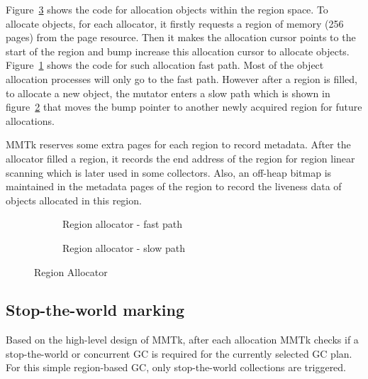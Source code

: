 Figure~\ref{fig:allocator} shows the code for allocation objects within the region space.
To allocate objects, for each allocator, it firstly requests a region of memory (256 pages) from the page resource.
Then it makes the allocation cursor points to the start of the region and bump increase this
allocation cursor to allocate objects. Figure~\ref{fig:allocator:fast} shows the code for such
allocation fast path. Most of the object allocation processes will only go to the
fast path. 
However after a region is filled, to allocate a new object, the mutator enters a slow path
which is shown in figure~\ref{fig:allocator:slow} that moves the bump pointer to another newly acquired region for future allocations.

MMTk reserves some extra pages for each region to record metadata.
After the allocator filled a region, it records the end address of the region for 
region linear scanning which is later used in some collectors. Also, an off-heap bitmap is
maintained in the metadata pages of the region to record the liveness data of objects allocated
in this region.

\begin{figure}
  \centering
  \begin{subfigure}[a]{\textwidth}
    
    \caption{Region allocator - fast path}
    \label{fig:allocator:fast}
  \end{subfigure}

  \begin{subfigure}[b]{\textwidth}
    
    \caption{Region allocator - slow path}
    \label{fig:allocator:slow}
  \end{subfigure}

  \caption{Region Allocator}
  \label{fig:allocator}
\end{figure}

\subsection{Stop-the-world marking}

Based on the high-level design of MMTk, after each allocation MMTk checks if a stop-the-world
or concurrent GC is required for the currently selected GC plan.
For this simple region-based GC, only stop-the-world collections are triggered.

